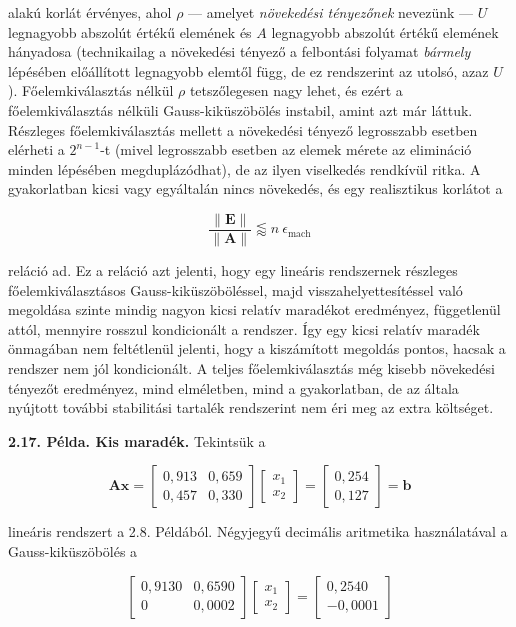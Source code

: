 \documentclass[
  magyar,
  11pt]{article}
\providecommand{\boldsymbol}[1]{\mathbf{#1}}
\begin{document}
alakú korlát érvényes, ahol \(\rho\) --- amelyet \emph{növekedési
tényezőnek} nevezünk --- \(U\) legnagyobb abszolút értékű elemének és
\(A\) legnagyobb abszolút értékű elemének hányadosa (technikailag a
növekedési tényező a felbontási folyamat \emph{bármely} lépésében
előállított legnagyobb elemtől függ, de ez rendszerint az utolsó, azaz
\(U\)). Főelemkiválasztás nélkül \(\rho\) tetszőlegesen nagy lehet, és
ezért a főelemkiválasztás nélküli Gauss-kiküszöbölés instabil, amint azt
már láttuk. Részleges főelemkiválasztás mellett a növekedési tényező
legrosszabb esetben elérheti a \(2^{n-1}\)-t (mivel legrosszabb esetben
az elemek mérete az elimináció minden lépésében megduplázódhat), de az
ilyen viselkedés rendkívül ritka. A gyakorlatban kicsi vagy egyáltalán
nincs növekedés, és egy realisztikus korlátot a

\[\frac{\|\boldsymbol{E}\|}{\|\boldsymbol{A}\|} \lessapprox n \ \epsilon_{\mathrm{mach}}\]

reláció ad. Ez a reláció azt jelenti, hogy egy lineáris rendszernek
részleges főelemkiválasztásos Gauss-kiküszöböléssel, majd
visszahelyettesítéssel való megoldása szinte mindig nagyon kicsi relatív
maradékot eredményez, függetlenül attól, mennyire rosszul kondicionált a
rendszer. Így egy kicsi relatív maradék önmagában nem feltétlenül
jelenti, hogy a kiszámított megoldás pontos, hacsak a rendszer nem jól
kondicionált. A teljes főelemkiválasztás még kisebb növekedési tényezőt
eredményez, mind elméletben, mind a gyakorlatban, de az általa nyújtott
további stabilitási tartalék rendszerint nem éri meg az extra költséget.

\textbf{2.17. Példa. Kis maradék.} Tekintsük a

\[\boldsymbol{A}\boldsymbol{x} = \begin{bmatrix} 0{,}913 & 0{,}659 \\ 0{,}457 & 0{,}330 \end{bmatrix} \begin{bmatrix} x_1 \\ x_2 \end{bmatrix} = \begin{bmatrix} 0{,}254 \\ 0{,}127 \end{bmatrix} = \boldsymbol{b}\]

lineáris rendszert a 2.8. Példából. Négyjegyű decimális aritmetika
használatával a Gauss-kiküszöbölés a

\[\begin{bmatrix} 0{,}9130 & 0{,}6590 \\ 0 & 0{,}0002 \end{bmatrix} \begin{bmatrix} x_1 \\ x_2 \end{bmatrix} = \begin{bmatrix} 0{,}2540 \\ -0{,}0001 \end{bmatrix}\]
\end{document}
